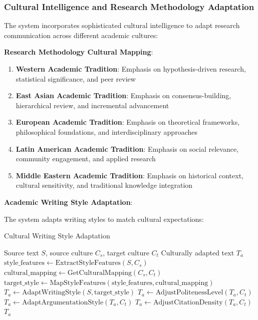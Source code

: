 \documentclass[10pt,twocolumn]{article}
\begin{document}
\subsubsection{Cultural Intelligence and Research Methodology Adaptation}

The system incorporates sophisticated cultural intelligence to adapt research communication across different academic cultures:

\textbf{Research Methodology Cultural Mapping}:

\begin{enumerate}
    \item \textbf{Western Academic Tradition}: Emphasis on hypothesis-driven research, statistical significance, and peer review
    \item \textbf{East Asian Academic Tradition}: Emphasis on consensus-building, hierarchical review, and incremental advancement
    \item \textbf{European Academic Tradition}: Emphasis on theoretical frameworks, philosophical foundations, and interdisciplinary approaches
    \item \textbf{Latin American Academic Tradition}: Emphasis on social relevance, community engagement, and applied research
    \item \textbf{Middle Eastern Academic Tradition}: Emphasis on historical context, cultural sensitivity, and traditional knowledge integration
\end{enumerate}

\textbf{Academic Writing Style Adaptation}:

The system adapts writing styles to match cultural expectations:

\begin{algorithm}[H]
\caption{Cultural Writing Style Adaptation}
\label{alg:cultural_adaptation}
\begin{algorithmic}[1]
\REQUIRE Source text $S$, source culture $C_s$, target culture $C_t$
\ENSURE Culturally adapted text $T_a$
\STATE $\text{style\_features} \leftarrow \text{ExtractStyleFeatures}(S, C_s)$
\STATE $\text{cultural\_mapping} \leftarrow \text{GetCulturalMapping}(C_s, C_t)$
\STATE $\text{target\_style} \leftarrow \text{MapStyleFeatures}(\text{style\_features}, \text{cultural\_mapping})$
\STATE $T_a \leftarrow \text{AdaptWritingStyle}(S, \text{target\_style})$
\STATE $T_a \leftarrow \text{AdjustPolitenessLevel}(T_a, C_t)$
\STATE $T_a \leftarrow \text{AdaptArgumentationStyle}(T_a, C_t)$
\STATE $T_a \leftarrow \text{AdjustCitationDensity}(T_a, C_t)$
\RETURN $T_a$
\end{algorithmic}
\end{algorithm}
\end{document}
